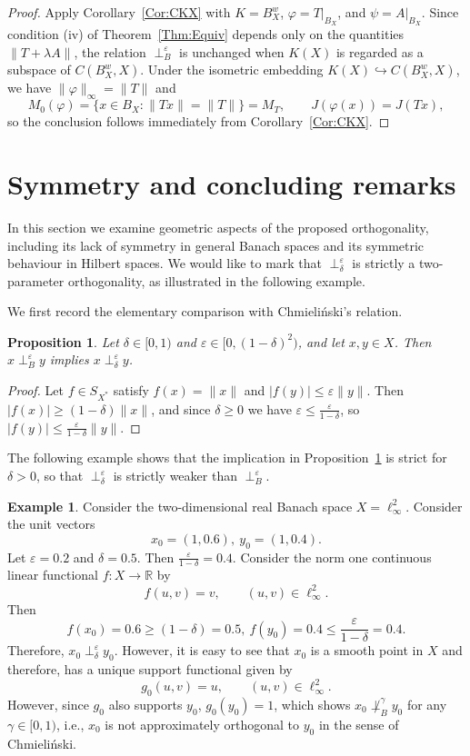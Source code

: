 \documentclass[11pt, reqno]{amsart}
\newtheorem{proposition}[theorem]{Proposition}
\theoremstyle{definition}
\newtheorem{example}[theorem]{Example}
\newcommand{\nperp}{\perp_{\delta}^\varepsilon}
\newcommand{\zperp}{\perp_B^{\varepsilon}}
\begin{document}
\begin{proof}
Apply Corollary~\ref{Cor:CKX} with $K=B_X^w$, $\varphi=T|_{B_X}$, and $\psi=A|_{B_X}$. Since condition (iv) of Theorem~\ref{Thm:Equiv} depends only on the
quantities $\|T+\lambda A\|$, the relation $\zperp$ is unchanged when $K(X)$ is regarded
as a subspace of $C(B_X^w,X)$. Under the isometric embedding $K(X)\hookrightarrow C(B_X^w,X)$, we have 
$\|\varphi\|_\infty=\|T\|$ and
\[
M_0(\varphi)=\{x\in B_X:\|Tx\|=\|T\|\}=M_T,\qquad J(\varphi(x))=J(Tx),
\]
so the conclusion follows immediately from Corollary~\ref{Cor:CKX}.
\end{proof}

\section{Symmetry and concluding remarks}\label{sec5}

\noindent In this section we examine geometric aspects of the proposed orthogonality, including its lack of symmetry in general Banach spaces and its symmetric behaviour in Hilbert spaces. We would like to mark that $\nperp$ is strictly a two-parameter orthogonality, as illustrated in the following example.


\noindent We first record the elementary comparison with Chmieli\'nski's relation.

\begin{proposition}\label{prop:compare}
Let $\delta\in[0,1)$ and $\varepsilon\in[0,(1-\delta)^2)$, and let $x,y\in X$. Then $x\zperp y$ implies 
$x\nperp y$.
\end{proposition}

\begin{proof}
Let $f\in S_{X^*}$ satisfy $f(x)=\|x\|$ and $|f(y)|\leq\varepsilon\|y\|$. Then 
$|f(x)|\geq (1-\delta)\|x\|$, and since $\delta\geq 0$ we have 
$\varepsilon\leq\frac{\varepsilon}{1-\delta}$, so 
$|f(y)|\leq\frac{\varepsilon}{1-\delta}\|y\|$.
\end{proof}

\noindent The following example shows that the implication in 
Proposition~\ref{prop:compare} is strict for $\delta>0$, so that $\nperp$ is strictly 
weaker than $\zperp$.


\begin{example}\label{ex:2-para}
Consider the two-dimensional real Banach space $X=\ell_\infty^2$. Consider the unit vectors
\[
x_0=(1,0.6),~y_0=(1,0.4).
\]
Let $\varepsilon=0.2$ and $\delta=0.5$. Then $\frac{\varepsilon}{1-\delta}=0.4.$ Consider the norm one continuous linear functional $f:X\to \mathbb{R}$ by 
\[
f(u,v)=v,\qquad (u,v)\in \ell_\infty^2.
\]
Then 
\[
f(x_0)=0.6\geq (1-\delta)=0.5,~f(y_0)=0.4\leq \frac{\varepsilon}{1-\delta}=0.4.
\]
Therefore, $x_0\nperp y_0$. However, it is easy to see that $x_0$ is a smooth point in $X$ and therefore, has a unique support functional given by
\[
g_0(u,v)=u, \qquad (u,v)\in \ell_\infty^2.
\]
However, since $g_0$ also supports $y_0$, $g_0(y_0)=1$, which shows $x_0\not\perp^{\gamma}_B y_0$ for any $\gamma\in [0,1)$, i.e., $x_0$ is not approximately orthogonal to $y_0$ in the sense of Chmieli\'nski.
\end{example}
\end{document}
